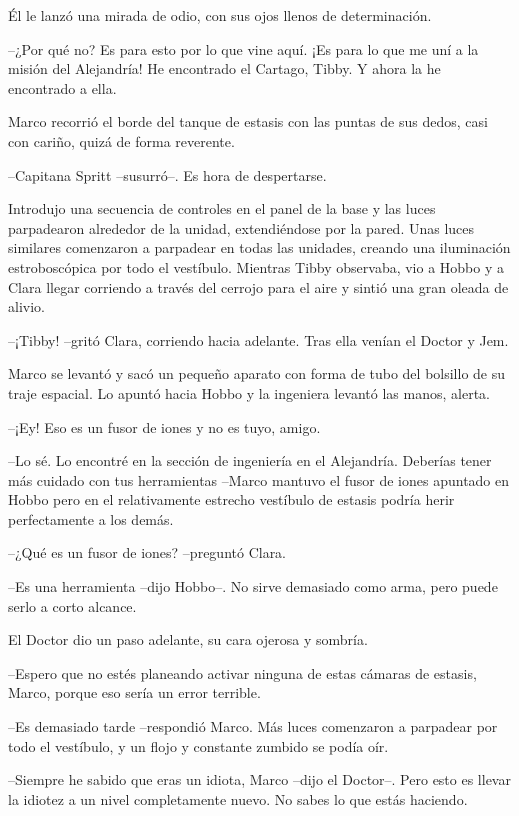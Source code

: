 {Él le lanzó una mirada de odio, con sus ojos llenos de determinación.}

{--¿Por qué no? Es para esto por lo que vine aquí. ¡Es para lo que me uní
 a la misión del Alejandría! He encontrado el Cartago, Tibby. Y ahora la
he encontrado a ella.}

{Marco recorrió el borde del tanque de estasis con las puntas de sus
dedos, casi con cariño, quizá de forma reverente.}

{--Capitana Spritt --susurró--. Es hora de despertarse.}

{Introdujo una secuencia de controles en el panel de la base y las luces
 parpadearon alrededor de la unidad, extendiéndose por la pared. Unas
 luces similares comenzaron a parpadear en todas las unidades, creando
 una iluminación estroboscópica por todo el vestíbulo. Mientras Tibby
 observaba, vio a Hobbo y a Clara llegar corriendo a través del cerrojo
para el aire y sintió una gran oleada de alivio.}

{--¡Tibby! --gritó Clara, corriendo hacia adelante. Tras ella venían el
Doctor y Jem.}

{Marco se levantó y sacó un pequeño aparato con forma de tubo del
 bolsillo de su traje espacial. Lo apuntó hacia Hobbo y la ingeniera
levantó las manos, alerta.}

{--¡Ey! Eso es un fusor de iones y no es tuyo, amigo.}

{--Lo sé. Lo encontré en la sección de ingeniería en el Alejandría.
 Deberías tener más cuidado con tus herramientas --Marco mantuvo el fusor
 de iones apuntado en Hobbo pero en el relativamente estrecho vestíbulo
de estasis podría herir perfectamente a los demás.}

{--¿Qué es un fusor de iones? --preguntó Clara.}

{--Es una herramienta --dijo Hobbo--. No sirve demasiado como arma, pero
puede serlo a corto alcance.}

{El Doctor dio un paso adelante, su cara ojerosa y sombría.}

{--Espero que no estés planeando activar ninguna de estas cámaras de
estasis, Marco, porque eso sería un error terrible.}

{--Es demasiado tarde --respondió Marco. Más luces comenzaron a parpadear
por todo el vestíbulo, y un flojo y constante zumbido se podía oír.}

{--Siempre he sabido que eras un idiota, Marco --dijo el Doctor--. Pero
 esto es llevar la idiotez a un nivel completamente nuevo. No sabes lo
que estás haciendo.}

